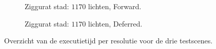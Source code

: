 \begin{figure}[t]
\begin{adjustbox}{minipage=\textwidth, scale=0.6}
\begin{subfigure}[b]{0.83\textwidth}
      \caption{Ziggurat stad: $1170$ lichten, Forward.}
      \label{fig:hs-exec-resolution-forward:city}
    \end{subfigure}
  \end{adjustbox} %
  \begin{adjustbox}{minipage=\textwidth, scale=0.6}
    \begin{subfigure}[b]{0.83\textwidth}
      \centering
      \def\svgwidth{\textwidth}
      
      \caption{Ziggurat stad: $1170$ lichten, Deferred.}
      \label{fig:hs-exec-resolution-deferred:city}
    \end{subfigure}
  \end{adjustbox}
  \caption{Overzicht van de executietijd per resolutie voor de drie testscenes.}
  \label{fig:hs-exec-resolution}
\end{figure}

